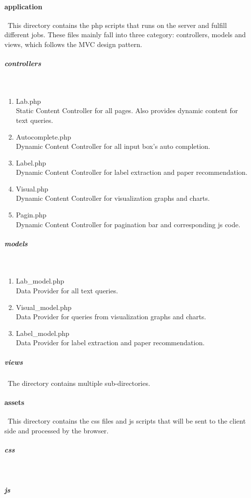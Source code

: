 \documentclass[a4paper, 10pt]{article}
\begin{document}
\paragraph{application}\ 
This directory contains the php scripts that runs on the server and fulfill different jobs. These files mainly fall into three category: controllers, models and views, which follows the MVC design pattern.
\subparagraph{controllers}\ 
\begin{enumerate}
\item Lab.php\\
  Static Content Controller for all pages. Also provides dynamic content for text queries.
\item Autocomplete.php\\
  Dynamic Content Controller for all input box's auto completion.
\item Label.php\\
  Dynamic Content Controller for label extraction and paper recommendation.
\item Visual.php\\
  Dynamic Content Controller for visualization graphs and charts.
\item Pagin.php\\
  Dynamic Content Controller for pagination bar and corresponding js code.
\end{enumerate}
\subparagraph{models}\ 
\begin{enumerate}
\item Lab\_model.php\\
  Data Provider for all text queries.
\item Visual\_model.php\\
  Data Provider for queries from visualization graphs and charts.
\item Label\_model.php\\
  Data Provider for label extraction and paper recommendation.
\end{enumerate}
\subparagraph{views}\
The directory contains multiple sub-directories.
\paragraph{assets}\
This directory contains the css files and js scripts that will be sent to the client side and processed by the browser.
\subparagraph{css}\
\subparagraph{js}\ 
\end{document}

